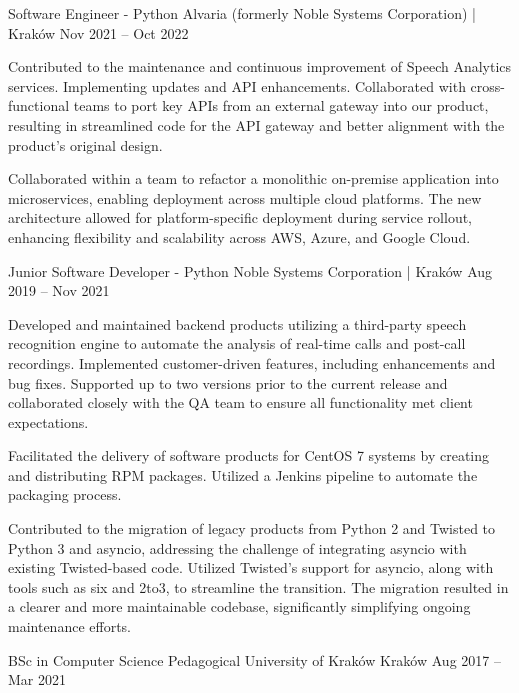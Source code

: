 \documentclass[]{awesome-cv}
\begin{document}
\begin{cventries}
{\begin{cvitems}
		\end{cvitems}}
	\cventry
	{Software Engineer - Python}
	{Alvaria (formerly Noble Systems Corporation) | }
	{Kraków}
	{Nov 2021 – Oct 2022}
	{\begin{cvitems}
		\item {Contributed to the maintenance and continuous improvement of Speech Analytics services. Implementing updates and API enhancements. Collaborated with cross-functional teams to port key APIs from an external gateway into our product, resulting in streamlined code for the API gateway and better alignment with the product's original design.}
		\item {Collaborated within a team to refactor a monolithic on-premise application into microservices, enabling deployment across multiple cloud platforms. The new architecture allowed for platform-specific deployment during service rollout, enhancing flexibility and scalability across AWS, Azure, and Google Cloud.}
		\end{cvitems}}
	\cventry
	{Junior Software Developer - Python}
	{Noble Systems Corporation | }
	{Kraków}
	{Aug 2019 – Nov 2021}
	{\begin{cvitems}
		\item {Developed and maintained backend products utilizing a third-party speech recognition engine to automate the analysis of real-time calls and post-call recordings. Implemented customer-driven features, including enhancements and bug fixes. Supported up to two versions prior to the current release and collaborated closely with the QA team to ensure all functionality met client expectations.}
		\item {Facilitated the delivery of software products for CentOS 7 systems by creating and distributing RPM packages. Utilized a Jenkins pipeline to automate the packaging process.}
		\item {Contributed to the migration of legacy products from Python 2 and Twisted to Python 3 and asyncio, addressing the challenge of integrating asyncio with existing Twisted-based code. Utilized Twisted’s support for asyncio, along with tools such as six and 2to3, to streamline the transition. The migration resulted in a clearer and more maintainable codebase, significantly simplifying ongoing maintenance efforts.}
		\end{cvitems}}
\end{cventries}
\begin{cventries}
	\cventry
	{BSc in Computer Science}
	{Pedagogical University of Kraków}
	{Kraków}
	{Aug 2017 – Mar 2021}
	{}
\end{cventries}
\end{document}
